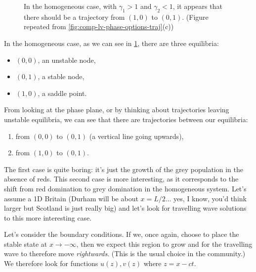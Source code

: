 \documentclass[main.tex]{subfiles}
\begin{document}
\begin{figure}
\centering

\caption{In the homogeneous case, with $\gamma_1>1$ and $\gamma_2<1$, it appears that there should be a trajectory from $(1,0)$ to $(0,1)$. (Figure repeated from \cref{fig:comp-lv-phase-options-traj}(c))}
\label{fig:comp-lv-phase-options-traj-3-repeated}
\end{figure}

In the homogeneous case, as we can see in \cref{fig:comp-lv-phase-options-traj-3-repeated}, there are three equilibria:
\begin{itemize}
	\item $(0,0)$, an unstable node,
	\item $(0,1)$, a stable node,
	\item $(1,0)$, a saddle point.
\end{itemize}
From looking at the phase plane, or by thinking about trajectories leaving unstable equilibria, we can see that there are trajectories between our equilibria: 
\begin{enumerate}[label=(\roman*)]
	\item from $(0,0)$ to $(0,1)$ (a vertical line going upwards),
	\item from $(1,0)$ to $(0,1)$.
\end{enumerate}
The first case is quite boring: it's just the growth of the grey population in the absence of reds. This second case is more interesting, as it corresponds to the shift from red domination to grey domination in the homogeneous system. Let's assume a 1D Britain (Durham will be about $x=L/2$... yes, I know, you'd think larger but Scotland is just really big) and let's look for travelling wave solutions to this more interesting case.

Let's consider the boundary conditions. If we, once again, choose to place the stable state at $x\to-\infty$, then we expect this region to grow and for the travelling wave to therefore move \emph{rightwards}. (This is the usual choice in the community.) We therefore look for functions $u(z),v(z)$ where $z= x-ct$. 
\end{document}
